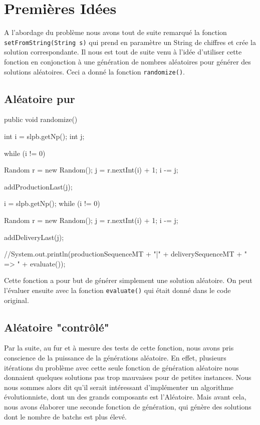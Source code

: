 \section{Premières Idées}
A l'abordage du problème nous avons tout de suite remarqué la fonction \verb!setFromString(String s)! qui prend en paramètre un String de chiffres et crée la solution correspondante. Il nous est tout de suite venu à l'idée d'utiliser cette fonction en conjonction à une génération de nombres aléatoires pour générer des solutions aléatoires. Ceci a donné la fonction \verb!randomize()!.

\subsection{Aléatoire pur}
\begin{java}
public void randomize() {
	int i = slpb.getNp();
	int j;

	while (i != 0) {
		Random r = new Random();
		j = r.nextInt(i) + 1;
		i -= j;
	
		addProductionLast(j);
	}

	i = slpb.getNp();
	while (i != 0) {
		Random r = new Random();
		j = r.nextInt(i) + 1;
		i -= j;
	
		addDeliveryLast(j);
	}
	//System.out.println(productionSequenceMT + "|" + deliverySequenceMT + " => " + evaluate());
}
\end{java}
\vspace{1em}
Cette fonction a pour but de générer simplement une solution aléatoire. On peut l'évaluer ensuite avec la fonction \verb!evaluate()! qui était donné dans le code original.
\vspace{2em}

\subsection{Aléatoire "contrôlé"}
Par la suite, au fur et à mesure des tests de cette fonction, nous avons pris conscience de la puissance de la générations aléatoire. En effet, plusieurs itérations du problème avec cette seule fonction de génération aléatoire nous donnaient quelques solutions pas trop mauvaises pour de petites instances. Nous nous sommes alors dit qu'il serait intéressant d'implémenter un algorithme évolutionniste, dont un des grands composants est l'Aléatoire. Mais avant cela, nous avons élaborer une seconde fonction de génération, qui génère des solutions dont le nombre de batchs est plus élevé.

